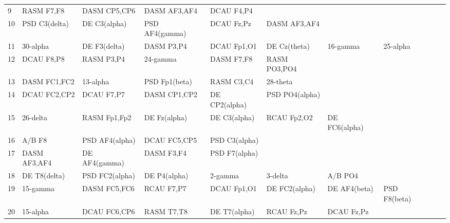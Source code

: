 \begin{landscape}
\begin{table}[]
\begin{tabular}{l|llllllll}
9        & RASM F7,F8     & DASM CP5,CP6   & DASM AF3,AF4   & DCAU F4,P4     &                &                &               &                &               &               \\
10       & PSD C3(delta)  & DE C3(alpha)   & PSD AF4(gamma) & DCAU Fz,Pz     & DASM AF3,AF4   &                &               &                &               &               \\
11       & 30-alpha       & DE F3(delta)   & DASM P3,P4     & DCAU Fp1,O1    & DE Cz(theta)   & 16-gamma       & 25-alpha      &                &               &               \\
12       & DCAU F8,P8     & RASM P3,P4     & 24-gamma       & DASM F7,F8     & RASM PO3,PO4   &                &               &                &               &               \\
13       & DASM FC1,FC2   & 13-alpha       & PSD Fp1(beta)  & RASM C3,C4     & 28-theta       &                &               &                &               &               \\
14       & DCAU FC2,CP2   & DCAU F7,P7     & DASM CP1,CP2   & DE CP2(alpha)  & PSD PO4(alpha) &                &               &                &               &               \\
15       & 26-delta       & RASM Fp1,Fp2   & DE Fz(alpha)   & DE C3(alpha)   & RCAU Fp2,O2    & DE FC6(alpha)  &               &                &               &               \\
16       & A/B F8         & PSD AF4(alpha) & DCAU FC5,CP5   & PSD C3(alpha)  &                &                &               &                &               &               \\
17       & DASM AF3,AF4   & DE AF4(gamma)  & DASM F3,F4     & PSD F7(alpha)  &                &                &               &                &               &               \\
18       & DE T8(delta)   & PSD FC2(alpha) & DE P4(alpha)   & 2-gamma        & 3-delta        & A/B PO4        &               &                &               &               \\
19       & 15-gamma       & DASM FC5,FC6   & RCAU F7,P7     & DCAU Fp1,O1    & DE FC2(alpha)  & DE AF4(beta)   & PSD F8(beta)  &                &               &               \\
20       & 15-alpha       & DCAU FC6,CP6   & RASM T7,T8     & DE T7(alpha)   & RCAU Fz,Pz     & DCAU Fz,Pz     &               &                &               &               \\

\end{tabular}
\end{table}
\end{landscape}
